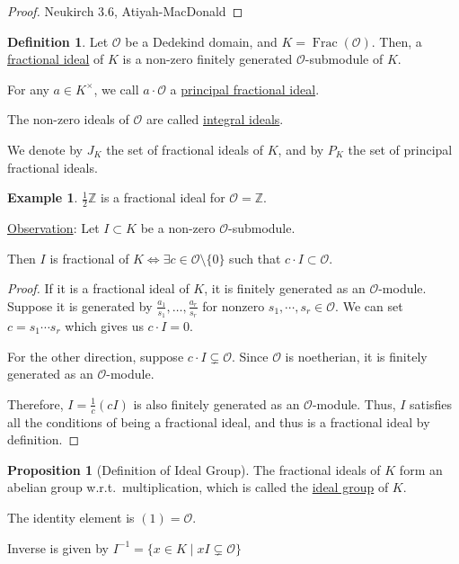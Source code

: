 \documentclass[openany]{amsbook}
\numberwithin{section}{chapter}
\theoremstyle{definition}
\newtheorem*{example}{Example}
\newtheorem*{definition}{Definition}
\newtheorem{proposition}[theorem]{Proposition}
\newcommand{\Frac}{\operatorname{Frac}}
\begin{document}
\begin{proof}
    Neukirch 3.6, Atiyah-MacDonald
\end{proof}

\begin{definition}
    Let \(\mathcal{O}\) be a Dedekind domain, and \(K = \Frac(\mathcal{O})\). Then, a \underline{fractional ideal} of \(K\) is a non-zero finitely generated \(\mathcal{O}\)-submodule of \(K\).
    
    For any \(a \in K^\times\), we call \(a \cdot \mathcal{O}\) a \underline{principal fractional ideal}.
    
    The non-zero ideals of \(\mathcal{O}\) are called \underline{integral ideals}.

    We denote by \(J_K\) the set of fractional ideals of \(K\), and by \(P_K\) the set of principal fractional ideals.

\end{definition}

\begin{example}
    \(\frac{1}{2}\mathbb{Z}\) is a fractional ideal for \(\mathcal{O} = \mathbb{Z}\). 
\end{example}

\underline{Observation}: Let \(I \subset K\) be a non-zero \(\mathcal{O}\)-submodule.

Then \(I\) is fractional of \(K \iff \exists c\in \mathcal{O} \setminus \{ 0 \}\) such that \(c \cdot I \subset \mathcal{O}\).

\begin{proof}
    If it is a fractional ideal of \(K\), it is finitely generated as an \(\mathcal{O} \)-module. Suppose it is generated by \( \frac{a_1}{s_1}, \dots, \frac{a_r}{s_r}   \) for nonzero \(s_1, \cdots , s_r \in \mathcal{O}\). We can set \(c = s_1 \cdots s_r\) which gives us \(c \cdot I = 0\).

    For the other direction, suppose \(c \cdot I \subsetneq \mathcal{O}\). Since \(\mathcal{O}\) is noetherian, it is finitely generated as an \(\mathcal{O}\)-module.

    Therefore, \(I = \frac{1}{c}(cI)\) is also finitely generated as an \(\mathcal{O}\)-module. Thus, \(I\) satisfies all the conditions of being a fractional ideal, and thus is a fractional ideal by definition. 

\end{proof}

\begin{proposition}
    [Definition of Ideal Group] The fractional ideals of \(K\) form an abelian group w.r.t.\ multiplication, which is called the \underline{ideal group} of \(K\).
    
    The identity element is \((1) = \mathcal{O}\).

    Inverse is given by \(I ^{-1} = \{ x \in K \mid xI \subsetneq \mathcal{O} \} \) 
\end{proposition}
\end{document}
